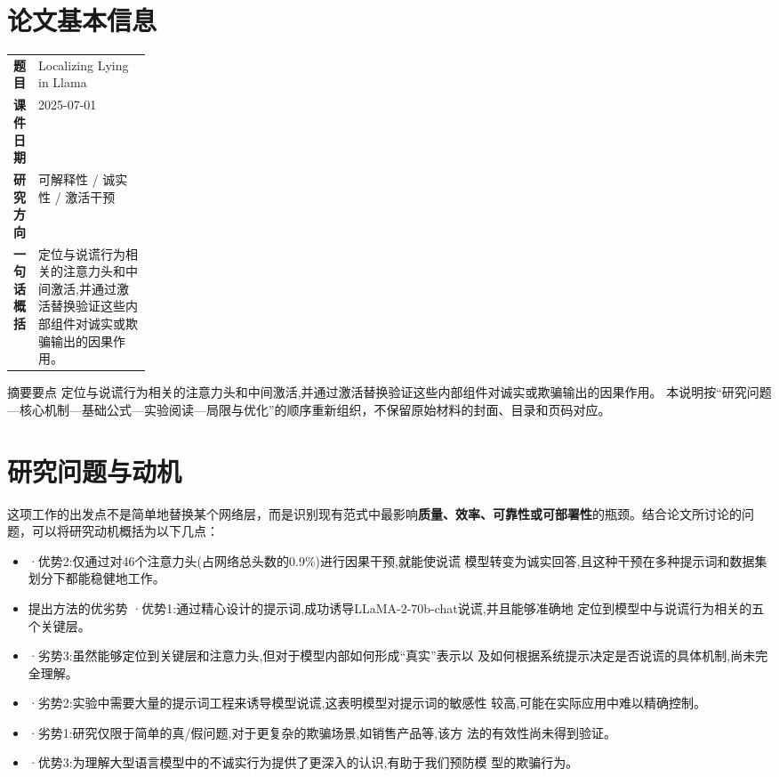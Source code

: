 \documentclass[UTF8,11pt,a4paper]{ctexart}
\newcommand{\term}[1]{\textbf{\textcolor{mainblue}{#1}}}
\begin{document}
\section{论文基本信息}
\begin{center}
\begin{tabularx}{0.94\linewidth}{>{\bfseries}p{0.18\linewidth}X}
\toprule
题目 & Localizing Lying in Llama\\
课件日期 & 2025-07-01\\
研究方向 & 可解释性 / 诚实性 / 激活干预\\
一句话概括 & 定位与说谎行为相关的注意力头和中间激活,并通过激活替换验证这些内部组件对诚实或欺骗输出的因果作用。\\
\bottomrule
\end{tabularx}
\end{center}

\begin{infobox}{摘要要点}
定位与说谎行为相关的注意力头和中间激活,并通过激活替换验证这些内部组件对诚实或欺骗输出的因果作用。 本说明按“研究问题—核心机制—基础公式—实验阅读—局限与优化”的顺序重新组织，不保留原始材料的封面、目录和页码对应。
\end{infobox}

\section{研究问题与动机}
这项工作的出发点不是简单地替换某个网络层，而是识别现有范式中最影响\term{质量、效率、可靠性或可部署性}的瓶颈。结合论文所讨论的问题，可以将研究动机概括为以下几点：
\begin{itemize}
\item ·优势2:仅通过对46个注意力头(占网络总头数的0.9\%)进行因果干预,就能使说谎 模型转变为诚实回答,且这种干预在多种提示词和数据集划分下都能稳健地工作。
\item 提出方法的优劣势 ·优势1:通过精心设计的提示词,成功诱导LLaMA-2-70b-chat说谎,并且能够准确地 定位到模型中与说谎行为相关的五个关键层。
\item ·劣势3:虽然能够定位到关键层和注意力头,但对于模型内部如何形成“真实”表示以 及如何根据系统提示决定是否说谎的具体机制,尚未完全理解。
\item ·劣势2:实验中需要大量的提示词工程来诱导模型说谎,这表明模型对提示词的敏感性 较高,可能在实际应用中难以精确控制。
\item ·劣势1:研究仅限于简单的真/假问题,对于更复杂的欺骗场景,如销售产品等,该方 法的有效性尚未得到验证。
\item ·优势3:为理解大型语言模型中的不诚实行为提供了更深入的认识,有助于我们预防模 型的欺骗行为。
\end{itemize}
\end{document}
